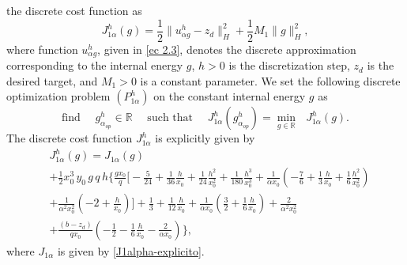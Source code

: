 \documentclass[11pt]{article}
\begin{document}
       
        the discrete cost function as
\begin{equation}    
  {J^h_{1\alpha}(g)} = \frac{1}{2} \lVert {u^h_{\alpha g}} - z_d \rVert_H^2 + \frac{1}{2} M_1 \lVert g \rVert_H^2,
\end{equation}
where function ${u^h_{\alpha g}}$, given in \eqref{ec 2.3}, {denotes the discrete approximation corresponding to the internal energy $g$, $h>0$ is the discretization step, $z_d$ is the desired target, and $M_1>0$ is a constant parameter.} We set the following discrete optimization problem
 ${(P^h_{1\alpha})}$ on the constant internal energy $g$ as
$$ \text{find }\quad {g^h_{\alpha_{op}}}\in \mathbb{R}\quad\text{ such that }\quad
{J^h_{1\alpha}(g^h_{\alpha_{op}})}=\min\limits_{g\in \mathbb{R}} {\text{ }J^h_{1 \alpha }(g).}
$$
The discrete cost function  ${J^h_{1 \alpha}}$  is explicitly given by
\begin{equation}\label{J1halpha-explicito}
\begin{array}{ll}
&{J^h_{1 \alpha}} ( g)  = J_{1\alpha} ( g )\\
& +\tfrac{1}{2} x_0^3\, y_0 \,g\, q\, h \Bigg\{ \tfrac{g x_0}{q} \Big[ - \tfrac{5 }{24}+ \tfrac{1}{36}\tfrac{h}{x_0} + \tfrac{1}{24}\tfrac{h^2}{x_0^2} + \tfrac{1}{180}\tfrac{h^3}{x_0^3} +\tfrac{1}{\alpha x_0}\left( - \tfrac{7 }{6 }+\tfrac{1}{3}\tfrac{h}{x_0}+\tfrac{1}{6}\tfrac{h^2}{x_0^2}\right)\\ 
& +\tfrac{1}{\alpha^2 x_0^2}\left( -2+\tfrac{h}{x_0}\right)\Big]
+ \tfrac{1}{3}+  \tfrac{1}{12}\tfrac{h}{x_0}+\tfrac{1}{\alpha x_0}\left( \tfrac{3}{2}+\tfrac{1}{6}\tfrac{h}{x_0}\right) +\tfrac{2}{\alpha^2 x_0^2}\\
&+\tfrac{(b-z_d)}{q x_0}\left(-\tfrac{1}{2}-\tfrac{1}{6}\tfrac{h}{x_0}-\tfrac{2}{\alpha x_0} \right) \Bigg\},
\end{array}
\end{equation}
where $J_{1\alpha}$ is given by \eqref{J1alpha-explicito}.
\end{document}
